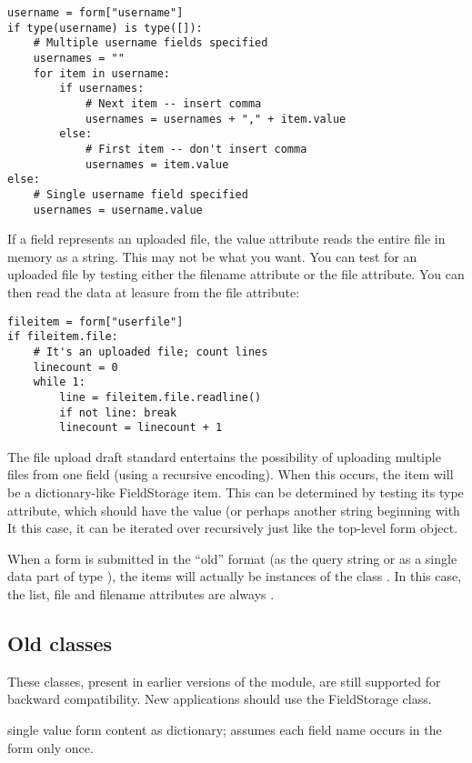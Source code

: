 \bcode\begin{verbatim}
username = form["username"]
if type(username) is type([]):
    # Multiple username fields specified
    usernames = ""
    for item in username:
        if usernames:
            # Next item -- insert comma
            usernames = usernames + "," + item.value
        else:
            # First item -- don't insert comma
            usernames = item.value
else:
    # Single username field specified
    usernames = username.value
\end{verbatim}\ecode
%
If a field represents an uploaded file, the value attribute reads the 
entire file in memory as a string.  This may not be what you want.  You can 
test for an uploaded file by testing either the filename attribute or the 
file attribute.  You can then read the data at leasure from the file 
attribute:

\bcode\begin{verbatim}
fileitem = form["userfile"]
if fileitem.file:
    # It's an uploaded file; count lines
    linecount = 0
    while 1:
        line = fileitem.file.readline()
        if not line: break
        linecount = linecount + 1
\end{verbatim}\ecode
%
The file upload draft standard entertains the possibility of uploading
multiple files from one field (using a recursive 
encoding).  When this occurs, the item will be a dictionary-like
FieldStorage item.  This can be determined by testing its type
attribute, which should have the value  (or
perhaps another string beginning with   It this case, it
can be iterated over recursively just like the top-level form object.

When a form is submitted in the ``old'' format (as the query string or as a 
single data part of type ), the items 
will actually be instances of the class .  In this case,
the list, file and filename attributes are always .


\subsection{Old classes}

These classes, present in earlier versions of the  module, are still 
supported for backward compatibility.  New applications should use the
FieldStorage class.

single value form content as dictionary; assumes each 
field name occurs in the form only once.

